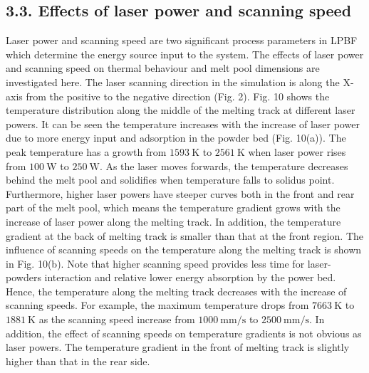 \documentclass[10pt]{article}
\begin{document}
\subsection*{3.3. Effects of laser power and scanning speed}
Laser power and scanning speed are two significant process parameters in LPBF which determine the energy source input to the system. The effects of laser power and scanning speed on thermal behaviour and melt pool dimensions are investigated here. The laser scanning direction in the simulation is along the X-axis from the positive to the negative direction (Fig. 2). Fig. 10 shows the temperature distribution along the middle of the melting track at different laser powers. It can be seen the temperature increases with the increase of laser power due to more energy input and adsorption in the powder bed (Fig. 10(a)). The peak temperature has a growth from $1593 \mathrm{~K}$ to $2561 \mathrm{~K}$ when laser power rises from $100 \mathrm{~W}$ to $250 \mathrm{~W}$. As the laser moves forwards, the temperature decreases behind the melt pool and solidifies when temperature falls to solidus point. Furthermore, higher laser powers have steeper curves both in the front and rear part of the melt pool, which means the temperature gradient grows with the increase of laser power along the melting track. In addition, the temperature gradient at the back of melting track is smaller than that at the front region. The influence of scanning speeds on the temperature along the melting track is shown in Fig. 10(b). Note that higher scanning speed provides less time for laser-powders interaction and relative lower energy absorption by the power bed. Hence, the temperature along the melting track decreases with the increase of scanning speeds. For example, the maximum temperature drops from $7663 \mathrm{~K}$ to $1881 \mathrm{~K}$ as the scanning speed increase from $1000 \mathrm{~mm} / \mathrm{s}$ to $2500 \mathrm{~mm} / \mathrm{s}$. In addition, the effect of scanning speeds on temperature gradients is not obvious as laser powers. The temperature gradient in the front of melting track is slightly higher than that in the rear side.
\end{document}
